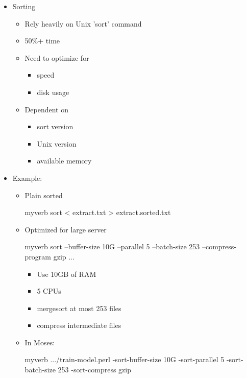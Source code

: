 \documentclass[landscape]{uedslides2C}
\begin{document}
\begin{itemize} \itemsep -1mm
\item {Sorting}
  \begin{itemize}
  \item Rely heavily on Unix 'sort' command
    \item 50\%+ time 
  \item Need to optimize for
     \begin{itemize}
      \item speed
      \item disk usage
     \end{itemize}

  \item Dependent on
    \begin{itemize}
    \item      sort version
    \item      Unix version
    \item      available memory
    \end{itemize}
  \end{itemize}
\end{itemize}


\begin{itemize} \itemsep -1mm
\item Example:
  \begin{itemize}
  \item Plain sorted
  \begin{SaveVerbatim}{myverb}
 sort < extract.txt > extract.sorted.txt
  \end{SaveVerbatim}
  \colorbox{gray}{}

  \item Optimized for large server
  \begin{SaveVerbatim}{myverb}
 sort --buffer-size 10G --parallel 5
	  --batch-size 253 --compress-program gzip ...
  \end{SaveVerbatim}
  \colorbox{gray}{}
    \begin{itemize}
    \item Use 10GB of RAM
    \item 5 CPUs
    \item merge\-sort at most 253 files
    \item compress intermediate files
    \end{itemize}

\item In Moses:
    \begin{SaveVerbatim}{myverb}
 .../train-model.perl -sort-buffer-size 10G -sort-parallel 5 
      -sort-batch-size 253 -sort-compress gzip 
    \end{SaveVerbatim}
    \colorbox{gray}{}

  \end{itemize}
\end{itemize}
\end{document}
